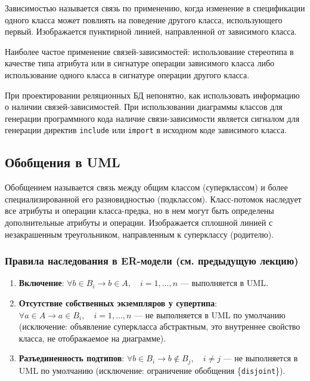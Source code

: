 \documentclass[a4paper,12pt]{article}
\begin{document}
Зависимостью называется связь по применению, когда изменение в спецификации одного класса может повлиять на поведение другого класса, использующего первый. Изображается пунктирной линией, направленной от зависимого класса.

Наиболее частое применение связей-зависимостей: использование стереотипа в качестве типа атрибута или в сигнатуре операции зависимого класса либо использование одного класса в сигнатуре операции другого класса.

При проектировании реляционных БД непонятно, как использовать информацию о наличии связей-зависимостей. При использовании диаграммы классов для генерации программного кода наличие связи-зависимости является сигналом для генерации директив \texttt{include} или \texttt{import} в исходном коде зависимого класса.

\subsection{Обобщения в UML}

Обобщением называется связь между общим классом (суперклассом) и более специализированной его разновидностью (подклассом). Класс-потомок наследует все атрибуты и операции класса-предка, но в нем могут быть определены дополнительные атрибуты и операции. Изображается сплошной линией с незакрашенным треугольником, направленным к суперклассу (родителю).

\subsubsection{Правила наследования в ER-модели (см. предыдущую лекцию)}

\begin{enumerate}
    \item \textbf{Включение}: $\forall b \in B_i \rightarrow b \in A, \quad i = 1, \ldots, n$ — выполняется в UML.
    \item \textbf{Отсутствие собственных экземпляров у супертипа}: $\forall a \in A \rightarrow a \in B_i, \quad i = 1, \ldots, n$ — не выполняется в UML по умолчанию (исключение: объявление суперкласса абстрактным, это внутреннее свойство класса, не отображаемое на диаграмме).
    \item \textbf{Разъединенность подтипов}: $\forall b \in B_i \rightarrow b \notin B_j, \quad i \neq j$ — не выполняется в UML по умолчанию (исключение: ограничение обобщения \{\texttt{disjoint}\}).
\end{enumerate}
\end{document}
